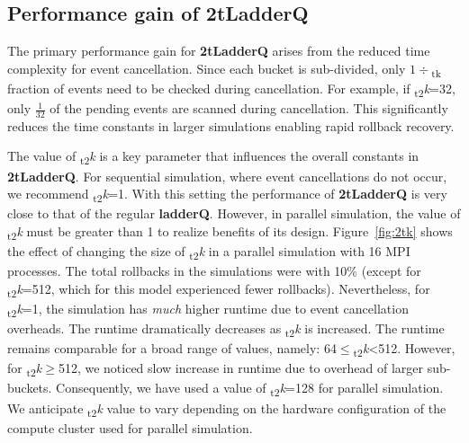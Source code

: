 \subsection{Performance gain of \textbf{2tLadderQ}}

The primary performance gain for \textbf{2tLadderQ} arises from the reduced time complexity for event cancellation. Since each bucket is sub-divided, only $1\div$\textsubscript{tk} fraction of events need to be checked during cancellation. For example, if \textsubscript{t2}\textit{k}=32, only $\frac{1}{32}$ of the pending events are scanned during cancellation. This significantly reduces the time constants in larger simulations enabling rapid rollback recovery.

The value of \textsubscript{t2}\textit{k} is a key parameter that influences the overall constants in \textbf{2tLadderQ}. For sequential simulation, where event cancellations do not occur, we recommend \textsubscript{t2}\textit{k}=1. With this setting the performance of \textbf{2tLadderQ} is very close to that of the regular \textbf{ladderQ}. However, in parallel simulation, the value of \textsubscript{t2}\textit{k} must be greater than 1 to realize benefits of its design. Figure~\ref{fig:2tk} shows the effect of changing the size of \textsubscript{t2}\textit{k} in a parallel simulation with 16 MPI processes. The total rollbacks in the simulations were with 10\% (except for \textsubscript{t2}\textit{k}=512, which for this model experienced fewer rollbacks). Nevertheless, for \textsubscript{t2}\textit{k}=1, the simulation has \emph{much} higher runtime due to event cancellation overheads.  The runtime dramatically decreases as \textsubscript{t2}\textit{k} is increased. The runtime remains comparable for a broad range of values, namely: 64$\le$\textsubscript{t2}\textit{k}\textless512. However, for \textsubscript{t2}\textit{k}$\ge$512, we noticed slow increase in runtime due to overhead of larger sub-buckets. Consequently, we have used a value of \textsubscript{t2}\textit{k}=128 for parallel simulation. We anticipate \textsubscript{t2}\textit{k} value to vary depending on the hardware configuration of the compute cluster used for parallel simulation. 



